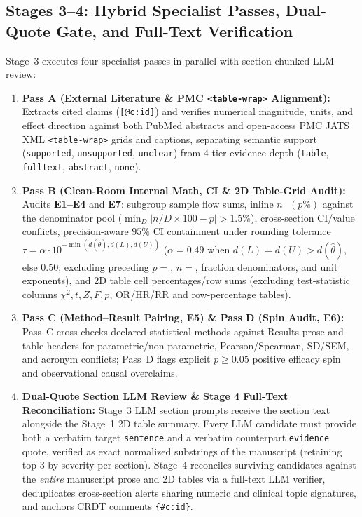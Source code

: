 \documentclass[11pt,a4paper]{article}
\begin{document}
\subsection{Stages 3--4: Hybrid Specialist Passes, Dual-Quote Gate, and Full-Text Verification}
Stage~3 executes four specialist passes in parallel with section-chunked LLM review:
\begin{enumerate}[leftmargin=1.5em,itemsep=2pt]
  \item \textbf{Pass A (External Literature \& PMC \texttt{<table-wrap>} Alignment):} Extracts cited claims (\texttt{[@c:id]}) and verifies numerical magnitude, units, and effect direction against both PubMed abstracts and open-access PMC JATS XML \texttt{<table-wrap>} grids and captions, separating semantic support (\texttt{supported}, \texttt{unsupported}, \texttt{unclear}) from 4-tier evidence depth (\texttt{table}, \texttt{fulltext}, \texttt{abstract}, \texttt{none}).
  \item \textbf{Pass B (Clean-Room Internal Math, CI \& 2D Table-Grid Audit):} Audits \textbf{E1--E4} and \textbf{E7}: subgroup sample flow sums, inline $n\text{ }(p\%)$ against the denominator pool ($\min_D |n/D\times 100 - p| > 1.5\%$), cross-section CI/value conflicts, precision-aware $95\%$ CI containment under rounding tolerance $\tau = \alpha \cdot 10^{-\min(d(\hat{\theta}), d(L), d(U))}$ ($\alpha = 0.49$ when $d(L)=d(U)>d(\hat{\theta})$, else $0.50$; excluding preceding $p=$, $n=$, fraction denominators, and unit exponents), and 2D table cell percentages/row sums (excluding test-statistic columns $\chi^2, t, Z, F, p$, OR/HR/RR and row-percentage tables).
  \item \textbf{Pass C (Method--Result Pairing, \textbf{E5}) \& Pass D (Spin Audit, \textbf{E6}):} Pass~C cross-checks declared statistical methods against Results prose and table headers for parametric/non-parametric, Pearson/Spearman, SD/SEM, and acronym conflicts; Pass~D flags explicit $p \ge 0.05$ positive efficacy spin and observational causal overclaims.
  \item \textbf{Dual-Quote Section LLM Review \& Stage 4 Full-Text Reconciliation:} Stage~3 LLM section prompts receive the section text alongside the Stage~1 2D table summary. Every LLM candidate must provide both a verbatim target \texttt{sentence} and a verbatim counterpart \texttt{evidence} quote, verified as exact normalized substrings of the manuscript (retaining top-$3$ by severity per section). Stage~4 reconciles surviving candidates against the \emph{entire} manuscript prose and 2D tables via a full-text LLM verifier, deduplicates cross-section alerts sharing numeric and clinical topic signatures, and anchors CRDT comments \texttt{\{\#c:id\}}.
\end{enumerate}
\end{document}
